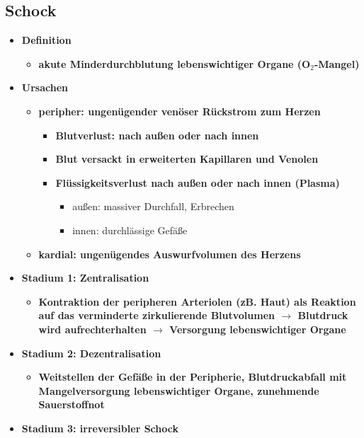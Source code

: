 \subsection{Schock}
	\begin{itemize}
		\item \textbf{Definition}
			\begin{itemize}
				\item \textbf{akute Minderdurchblutung lebenswichtiger Organe (O$_2$-Mangel)}
			\end{itemize}
		\item \textbf{Ursachen}
			\begin{itemize}
				\item \textbf{peripher: ungenügender venöser Rückstrom zum Herzen}
					\begin{itemize}
						\item \textbf{Blutverlust: nach außen oder nach innen}
						\item \textbf{Blut versackt in erweiterten Kapillaren und Venolen}
						\item \textbf{Flüssigkeitsverlust nach außen oder nach innen (Plasma)} 
							\begin{itemize}
								\item außen: massiver Durchfall, Erbrechen
								\item innen: durchlässige Gefäße
							\end{itemize}
					\end{itemize}
				\item \textbf{kardial: ungenügendes Auswurfvolumen des Herzens}
			\end{itemize}
		\item \textbf{Stadium 1: Zentralisation}
			\begin{itemize}
				\item \textbf{Kontraktion der peripheren Arteriolen (zB. Haut) als Reaktion auf das verminderte zirkulierende Blutvolumen $\rightarrow$ Blutdruck wird aufrechterhalten $\rightarrow$ Versorgung lebenswichtiger Organe}
			\end{itemize}
		\item \textbf{Stadium 2: Dezentralisation}
			\begin{itemize}
				\item \textbf{Weitstellen der Gefäße in der Peripherie, Blutdruckabfall mit Mangelversorgung lebenswichtiger Organe, zunehmende Sauerstoffnot}
			\end{itemize}
		\item \textbf{Stadium 3: irreversibler Schock}

\end{itemize}
